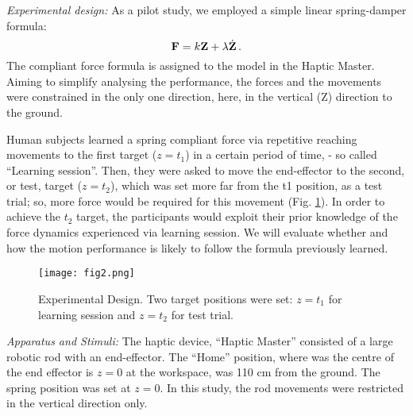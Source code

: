 
\textit{Experimental design:} As a pilot study, we employed a simple linear spring-damper formula:
%
\begin{equation}
\mathbf{F} = k \mathbf{Z} + \lambda \dot{\mathbf{Z}} \, .
\end{equation}
%
The compliant force formula is assigned to the model in the Haptic Master. Aiming to simplify analysing the performance, the forces and the movements were constrained in the only one direction, here, in the vertical
(Z) direction to the ground.

Human subjects learned a spring compliant force via repetitive reaching movements to the first target ($z = t_1$) in a certain period of time, - so called ``Learning session''. Then, they were asked to move the end-effector to the second, or test, target ($z = t_2$), which was set more far from the t1 position, as a test trial; so, more force would be required for this movement (Fig. \ref*{design}). In order to achieve the $t_2$ target, the participants would exploit their prior knowledge of the force dynamics experienced via learning session. We will evaluate whether and how the motion performance is likely to follow the formula previously learned.
%
\begin{figure}
	\centering
	\texttt{[image: fig2.png]}
	\caption{Experimental Design. Two target positions were set: $z = t_1$ for learning session and $z = t_2$ for test trial.}
	\label{design}
\end{figure}



\textit{Apparatus and Stimuli:} The haptic device, ``Haptic Master'' consisted of a large robotic rod with an end-effector. The ``Home'' position, where was the centre of the end effector is $z = 0$ at the workspace, was 110 cm from the ground. The spring position was set at $z = 0$. In this study, the rod movements were restricted in the vertical direction only.

